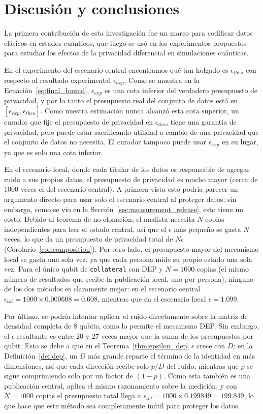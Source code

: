 \documentclass{ieeeaccess}
\begin{document}
\section{Discusión y conclusiones}
\label{sec:discussion_and_conclusion}

La primera contribución de esta investigación fue un marco para codificar datos clásicos en estados cuánticos, que luego se usó en los experimentos propuestos para estudiar los efectos de la privacidad diferencial en simulaciones cuánticas.

En el experimento del escenario central encontramos qué tan holgado es $\epsilon_{theo}$ con respecto al resultado experimental $\epsilon_{exp}$. Como se muestra en la Ecuación~\eqref{eq:final_bound}, $\epsilon_{exp}$ es una cota inferior del verdadero presupuesto de privacidad, y por lo tanto el presupuesto real del conjunto de datos está en $[\epsilon_{exp}, \epsilon_{theo}]$. Como nuestra estimación nunca alcanzó esta cota superior, un curador que fije el presupuesto de privacidad en $\epsilon_{theo}$ tiene una garantía de privacidad, pero puede estar sacrificando utilidad a cambio de una privacidad que el conjunto de datos no necesita. El curador tampoco puede usar $\epsilon_{exp}$ en su lugar, ya que es solo una cota inferior.

En el escenario local, donde cada titular de los datos es responsable de agregar ruido a sus propios datos, el presupuesto de privacidad es mucho mayor (cerca de 1000 veces el del escenario central). A primera vista esto podría parecer un argumento directo para usar solo el escenario central al proteger datos; sin embargo, como se vio en la Sección~\ref{sec:measurement_release}, esto tiene un costo. Debido al teorema de no clonación, el analista necesita $N$ copias independientes para leer el estado central, así que el $\epsilon$ más pequeño se gasta $N$ veces, lo que da un presupuesto de privacidad total de $N\epsilon$ (Corolario~\ref{cor:composition}). Por otro lado, el presupuesto mayor del mecanismo local se gasta una sola vez, ya que cada persona mide su propio estado una sola vez. Para el único qubit de \texttt{collateral} con DEP y $N = 1000$ copias (el mismo número de resultados que recibe la publicación local, uno por persona), ninguno de los dos métodos es claramente mejor: en el escenario central $\epsilon_{tot} = 1000 \times 0.000608 = 0.608$, mientras que en el escenario local $\epsilon = 1.099$.

Por último, se podría intentar aplicar el ruido directamente sobre la matriz de densidad completa de 8 qubits, como lo permite el mecanismo DEP. Sin embargo, el $\epsilon$ resultante es entre 20 y 27 veces mayor que la suma de los presupuestos por qubit. Esto se debe a que en el Teorema~\ref{thm:epsilon_dep} $\epsilon$ crece con $D$: en la Definición~\ref{def:dep}, un $D$ más grande reparte el término de la identidad en más dimensiones, así que cada dirección recibe solo $p/D$ del ruido, mientras que $\rho$ se sigue comprimiendo solo por un factor de $(1-p)$. Como esta también es una publicación central, aplica el mismo razonamiento sobre la medición, y con $N = 1000$ copias el presupuesto total llega a $\epsilon_{tot} = 1000 \times 0.199849 = 199.849$, lo que hace que este método sea completamente inútil para proteger los datos.
\end{document}
